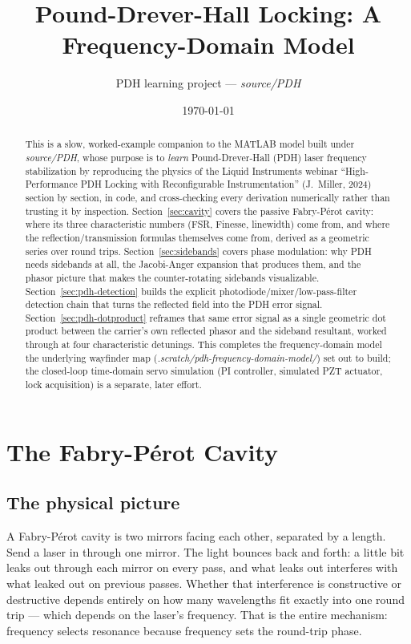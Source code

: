 \documentclass[9pt]{article}
\title{Pound-Drever-Hall Locking: A Frequency-Domain Model}
\author{PDH learning project --- \textit{source/PDH}}
\date{\today}
\begin{document}
\maketitle

\begin{abstract}
This is a slow, worked-example companion to the MATLAB model built under
\textit{source/PDH}, whose purpose is to \emph{learn} Pound-Drever-Hall (PDH)
laser frequency stabilization by reproducing the physics of the Liquid
Instruments webinar ``High-Performance PDH Locking with Reconfigurable
Instrumentation'' (J.\ Miller, 2024) section by section, in code, and
cross-checking every derivation numerically rather than trusting it by
inspection. Section~\ref{sec:cavity} covers the passive Fabry-P\'erot cavity:
where its three characteristic numbers (FSR, Finesse, linewidth) come from,
and where the reflection/transmission formulas themselves come from, derived
as a geometric series over round trips. Section~\ref{sec:sidebands} covers
phase modulation: why PDH needs sidebands at all, the Jacobi-Anger expansion
that produces them, and the phasor picture that makes the counter-rotating
sidebands visualizable. Section~\ref{sec:pdh-detection} builds the explicit
photodiode/mixer/low-pass-filter detection chain that turns the reflected
field into the PDH error signal. Section~\ref{sec:pdh-dotproduct} reframes
that same error signal as a single geometric dot product between the
carrier's own reflected phasor and the sideband resultant, worked through at
four characteristic detunings. This completes the frequency-domain model the
underlying wayfinder map (\textit{.scratch/pdh-frequency-domain-model/}) set
out to build; the closed-loop time-domain servo simulation (PI controller,
simulated PZT actuator, lock acquisition) is a separate, later effort.
\end{abstract}

\section{The Fabry-P\'erot Cavity}
\label{sec:cavity}
\subsection{The physical picture}
\label{sec:cavity-picture}
A Fabry-P\'erot cavity is two mirrors facing each other, separated by a
length. Send a laser in through one mirror. The light bounces back and
forth: a little bit leaks out through each mirror on every pass, and what
leaks out interferes with what leaked out on previous passes. Whether that
interference is constructive or destructive depends entirely on how many
wavelengths fit exactly into one round trip --- which depends on the laser's
frequency. That is the entire mechanism: frequency selects resonance because
frequency sets the round-trip phase.
\end{document}
